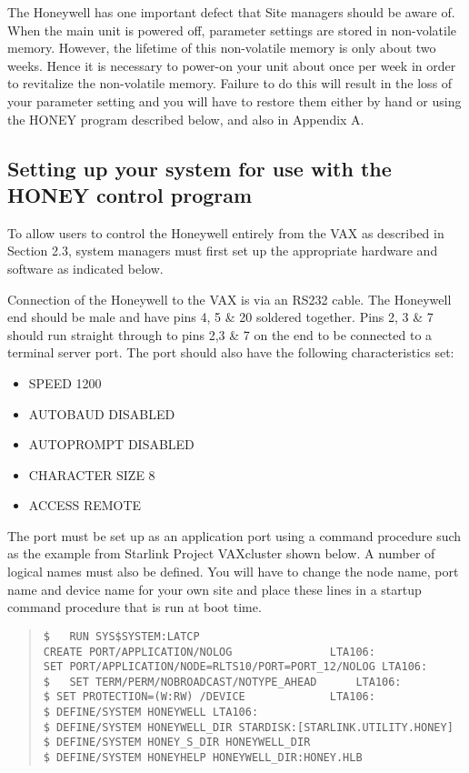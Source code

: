 The Honeywell has one important defect that Site managers should be aware
of. When the main unit is powered off, parameter settings are stored in
non-volatile memory. However, the lifetime of this non-volatile memory
is only about two weeks. Hence it is necessary to power-on your unit
about once per week in order to revitalize the non-volatile memory. Failure
to do this will result in the loss of your parameter setting and you will have
to restore them either by hand or using the HONEY program described below, 
and also in Appendix A. 

\subsection{Setting up your system for use with the HONEY control program}

To allow users to control the Honeywell entirely from the VAX as described in 
Section 2.3, system managers must first set up the appropriate hardware and
software as indicated below. 

Connection of the Honeywell to the VAX is via an RS232 cable. The Honeywell end should be male
and have pins 4, 5 \& 20 soldered together. Pins 2, 3 \& 7 should 
run straight through to pins 2,3 \& 7 on the end to be connected 
to a terminal server port. 
The port should also have the following characteristics set:

\begin{itemize}

\item SPEED 1200

\item AUTOBAUD DISABLED

\item AUTOPROMPT DISABLED

\item CHARACTER SIZE 8

\item ACCESS REMOTE

\end{itemize}

The port must be set up as an application port using
a command procedure such as the example from Starlink Project VAXcluster
shown below. A number of logical names must also be defined. 
You will have to change the
node name, port name and device name for your own site and place
these lines in a startup command procedure that is run at boot time.

\begin{quote}
\begin{verbatim}
$	RUN SYS$SYSTEM:LATCP
CREATE PORT/APPLICATION/NOLOG				LTA106:
SET PORT/APPLICATION/NODE=RLTS10/PORT=PORT_12/NOLOG	LTA106:
$	SET TERM/PERM/NOBROADCAST/NOTYPE_AHEAD 		LTA106:
$ SET PROTECTION=(W:RW) /DEVICE				LTA106:
$ DEFINE/SYSTEM HONEYWELL LTA106:
$ DEFINE/SYSTEM HONEYWELL_DIR STARDISK:[STARLINK.UTILITY.HONEY]
$ DEFINE/SYSTEM HONEY_S_DIR HONEYWELL_DIR
$ DEFINE/SYSTEM HONEYHELP HONEYWELL_DIR:HONEY.HLB
\end{verbatim}
\end{quote}

